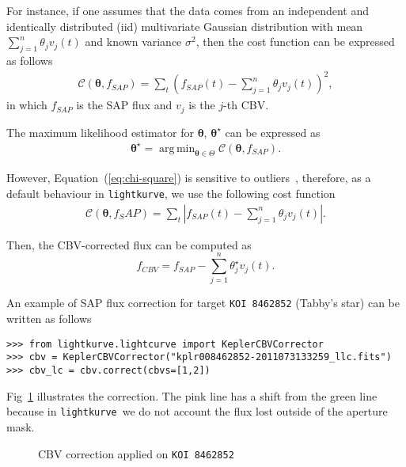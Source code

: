 \documentclass[twocolumn]{aastex62}
\newcommand{\lightkurve}{\texttt{lightkurve}}
\DeclareMathOperator*{\argmin}{arg\,min}
\begin{document}
For instance, if one assumes that the data comes from an independent and
identically distributed (iid) multivariate Gaussian distribution with mean
$\sum_{j=1}^{n}\theta_j v_{j}(t)$ and known variance $\sigma^2$, then the
cost function can be expressed as follows
\begin{align}
    \mathcal{C}(\bm{\theta}, f_{SAP}) = \sum_{t}\left(f_{SAP}(t)
    - \sum_{j=1}^{n}\theta_j v_{j}(t)\right)^2,
\label{eq:chi-square}
\end{align}
in which $f_{SAP}$ is the SAP flux and $v_j$ is the $j$-th CBV.

The maximum likelihood estimator for $\bm{\theta}$, $\bm{\theta^{\star}}$ can be
expressed as
\begin{align}
    \bm{\theta}^{\star} = \argmin_{\bm{\theta} \in \Theta} \mathcal{C}(\bm{\theta}, f_{SAP}).
\end{align}

However, Equation~(\ref{eq:chi-square}) is sensitive to outliers~\cite{ivezi2014},
therefore, as a default behaviour in \lightkurve, we use the following cost
function
\begin{align}
    \mathcal{C}(\bm{\theta}, f_SAP) = \sum_{t} \left\rvert f_{SAP}(t)
    - \sum_{j=1}^{n}\theta_j v_{j}(t)\right\rvert.
\label{eq:l1-norm}
\end{align}


Then, the CBV-corrected flux can be computed as
\begin{equation}
    f_{CBV} = f_{SAP} - \sum_{j=1}^{n}\theta^{\star}_j v_{j}(t).
\end{equation}

An example of SAP flux correction for target \texttt{KOI 8462852}
(Tabby's star) can be written as follows
\begin{verbatim}
>>> from lightkurve.lightcurve import KeplerCBVCorrector
>>> cbv = KeplerCBVCorrector("kplr008462852-2011073133259_llc.fits")
>>> cbv_lc = cbv.correct(cbvs=[1,2])
\end{verbatim}

Fig~\ref{fig:cbv-correction} illustrates the correction. The pink line has a shift from
the green line because in \lightkurve~we do not account the flux lost outside of the aperture mask.

\begin{figure}[!htb]
    \centering
    \caption{CBV correction applied on \texttt{KOI 8462852}}
    \label{fig:cbv-correction}
\end{figure}
\end{document}
